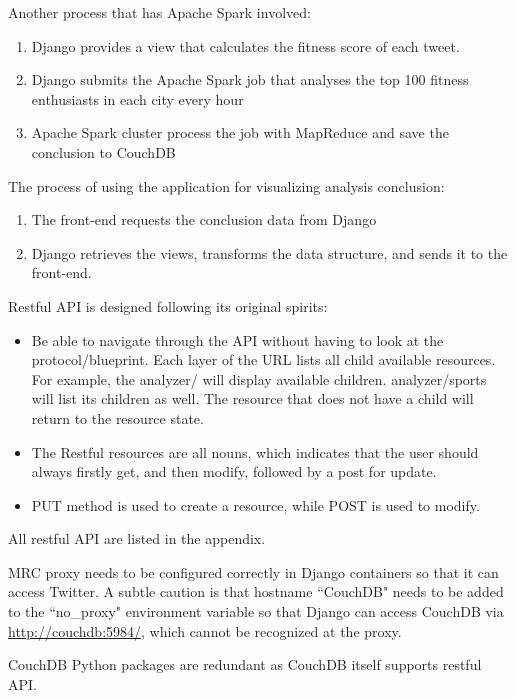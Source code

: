 Another process that has Apache Spark involved:

\begin{enumerate}
  \item Django provides a view that calculates the fitness score of each tweet.
  \item Django submits the Apache Spark job that analyses the top 100 fitness enthusiasts in each city every hour
  \item Apache Spark cluster process the job with MapReduce and save the conclusion to CouchDB
\end{enumerate}


The process of using the application for visualizing analysis conclusion:

\begin{enumerate}
  \item The front-end requests the conclusion data from Django
  \item Django retrieves the views, transforms the data structure, and sends it to the front-end.
\end{enumerate}

Restful API is designed following its original spirits:

\begin{itemize}
\item Be able to navigate through the API without having to look at the protocol/blueprint. Each layer of the URL lists all child available resources. For example, the analyzer/ will display available children. analyzer/sports will list its children as well. The resource that does not have a child will return to the resource state.
\item The Restful resources are all nouns, which indicates that the user should always firstly get, and then modify, followed by a post for update.
\item PUT method is used to create a resource, while POST is used to modify.
\end{itemize}

All restful API are listed in the appendix.

MRC proxy needs to be configured correctly in Django containers so that it can access Twitter. A subtle caution is that hostname ``CouchDB" needs to be added to the ``no\_proxy" environment variable so that Django can access CouchDB via \url{http://couchdb:5984/}, which cannot be recognized at the proxy.   

CouchDB Python packages are redundant as CouchDB itself supports restful API. 

